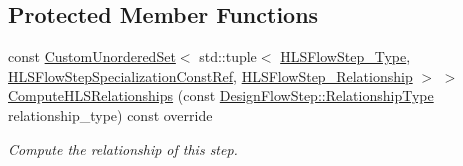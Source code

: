 \subsection*{Protected Member Functions}
\begin{DoxyCompactItemize}
\item 
const \hyperlink{classCustomUnorderedSet}{Custom\+Unordered\+Set}$<$ std\+::tuple$<$ \hyperlink{hls__step_8hpp_ada16bc22905016180e26fc7e39537f8d}{H\+L\+S\+Flow\+Step\+\_\+\+Type}, \hyperlink{hls__step_8hpp_a5fdd2edf290c196531d21d68e13f0e74}{H\+L\+S\+Flow\+Step\+Specialization\+Const\+Ref}, \hyperlink{hls__step_8hpp_a3ad360b9b11e6bf0683d5562a0ceb169}{H\+L\+S\+Flow\+Step\+\_\+\+Relationship} $>$ $>$ \hyperlink{classBB__based__stg_aea701ad71c3a60c0f6abe3a7f0ca38c9}{Compute\+H\+L\+S\+Relationships} (const \hyperlink{classDesignFlowStep_a723a3baf19ff2ceb77bc13e099d0b1b7}{Design\+Flow\+Step\+::\+Relationship\+Type} relationship\+\_\+type) const override
\begin{DoxyCompactList}\small\item\em Compute the relationship of this step. \end{DoxyCompactList}\end{DoxyCompactItemize}
